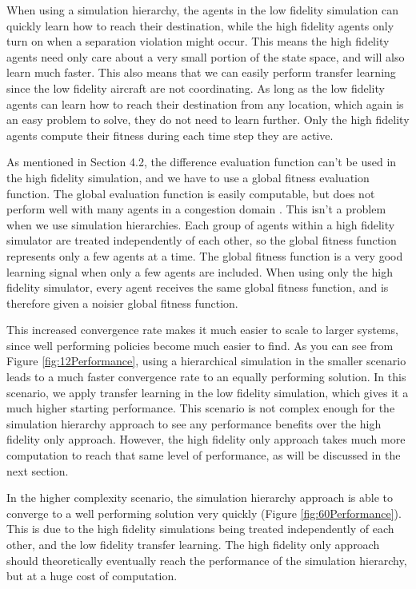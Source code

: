 \documentclass{aamas2014}
\begin{document}
When using a simulation hierarchy, the agents in the low fidelity simulation can quickly learn how to reach their destination, while the high fidelity agents only turn on when a separation violation might occur. This means the high fidelity agents need only care about a very small portion of the state space, and will also learn much faster. This also means that we can easily perform transfer learning since the low fidelity aircraft are not coordinating. As long as the low fidelity agents can learn how to reach their destination from any location, which again is an easy problem to solve, they do not need to learn further. Only the high fidelity agents compute their fitness during each time step they are active.

As mentioned in Section 4.2, the difference evaluation function can't be used in the high fidelity simulation, and we have to use a global fitness evaluation function. The global evaluation function is easily computable, but does not perform well with many agents in a congestion domain \cite{AAMAS12-agmon, Colby:2012:SFF:2343576.2343637, tumer-agogino_jaamas12}. This isn't a problem when we use simulation hierarchies. Each group of agents within a high fidelity simulator are treated independently of each other, so the global fitness function represents only a few agents at a time. The global fitness function is a very good learning signal when only a few agents are included. When using only the high fidelity simulator, every agent receives the same global fitness function, and is therefore given a noisier global fitness function. 

This increased convergence rate makes it much easier to scale to larger systems, since well performing policies become much easier to find. As you can see from Figure \ref{fig:12Performance}, using a hierarchical simulation in the smaller scenario leads to a much faster convergence rate to an equally performing solution. In this scenario, we apply transfer learning in the low fidelity simulation, which gives it a much higher starting performance. This scenario is not complex enough for the simulation hierarchy approach to see any performance benefits over the high fidelity only approach. However, the high fidelity only approach takes much more computation to reach that same level of performance, as will be discussed in the next section.

In the higher complexity scenario, the simulation hierarchy approach is able to converge to a well performing solution very quickly (Figure \ref{fig:60Performance}). This is due to the high fidelity simulations being treated independently of each other, and the low fidelity transfer learning. The high fidelity only approach should theoretically eventually reach the performance of the simulation hierarchy, but at a huge cost of computation.
\end{document}
